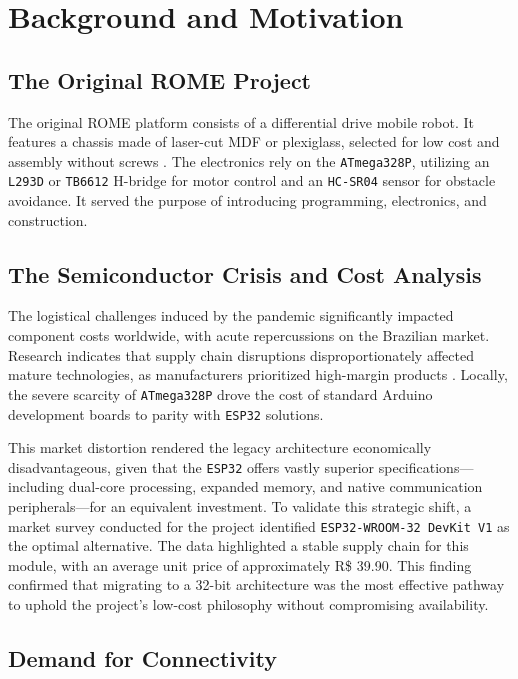 \documentclass[conference]{IEEEtran}
\begin{document}
\section{Background and Motivation}

\subsection{The Original ROME Project}

The original ROME platform consists of a differential drive mobile robot. It features a chassis made of laser-cut MDF or plexiglass, selected for low cost and assembly without screws \cite{rome_cotb}. The electronics rely on the \texttt{ATmega328P}, utilizing an \texttt{L293D} or \texttt{TB6612} H-bridge for motor control and an \texttt{HC-SR04} sensor for obstacle avoidance. It served the purpose of introducing programming, electronics, and construction.

\subsection{The Semiconductor Crisis and Cost Analysis}

The logistical challenges induced by the pandemic significantly impacted component costs worldwide, with acute repercussions on the Brazilian market. Research indicates that supply chain disruptions disproportionately affected mature technologies, as manufacturers prioritized high-margin products \cite{semi_crisis_academic}. Locally, the severe scarcity of \texttt{ATmega328P} drove the cost of standard Arduino development boards to parity with \texttt{ESP32} solutions.

This market distortion rendered the legacy architecture economically disadvantageous, given that the \texttt{ESP32} offers vastly superior specifications—including dual-core processing, expanded memory, and native communication peripherals—for an equivalent investment. To validate this strategic shift, a market survey conducted for the project identified \texttt{ESP32-WROOM-32 DevKit V1} as the optimal alternative. The data highlighted a stable supply chain for this module, with an average unit price of approximately R\$ 39.90. This finding confirmed that migrating to a 32-bit architecture was the most effective pathway to uphold the project's low-cost philosophy without compromising availability.

\subsection{Demand for Connectivity}
\end{document}
